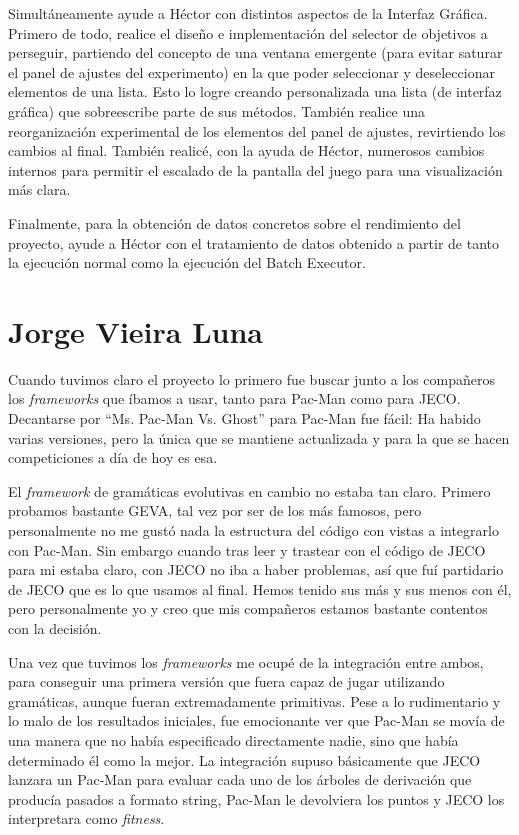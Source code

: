 Simultáneamente ayude a Héctor con distintos aspectos de la Interfaz Gráfica. Primero de todo, realice el diseño e implementación del selector de objetivos a perseguir, partiendo del concepto de una ventana emergente (para evitar saturar el panel de ajustes del experimento) en la que poder seleccionar y deseleccionar elementos de una lista. Esto lo logre creando personalizada una lista (de interfaz gráfica) que sobreescribe parte de sus métodos. También realice una reorganización experimental de los elementos del panel de ajustes, revirtiendo los cambios al final. También realicé, con la ayuda de Héctor, numerosos cambios internos para permitir el escalado de la pantalla del juego para una visualización más clara.
 
Finalmente, para la obtención de datos concretos sobre el rendimiento del proyecto, ayude a Héctor con el tratamiento de datos obtenido a partir de tanto la ejecución normal como la ejecución del Batch Executor.


\section{Jorge Vieira Luna}
Cuando tuvimos claro el proyecto lo primero fue buscar junto a los compañeros los \textit{frameworks} que íbamos a usar, tanto para Pac-Man como para JECO. Decantarse por ``Ms. Pac-Man Vs. Ghost'' para Pac-Man fue fácil: Ha habido varias versiones, pero la única que se mantiene actualizada y para la que se hacen competiciones a día de hoy es esa.

El \textit{framework} de gramáticas evolutivas en cambio no estaba tan claro. Primero probamos bastante GEVA, tal vez por ser de los más famosos, pero personalmente no me gustó nada la estructura del código con vistas a integrarlo con Pac-Man. Sin embargo cuando tras leer y trastear con el código de JECO para mi estaba claro, con JECO no iba a haber problemas, así que fuí partidario de JECO que es lo que usamos al final. Hemos tenido sus más y sus menos con él, pero personalmente yo y creo que mis compañeros estamos bastante contentos con la decisión.

Una vez que tuvimos los \textit{frameworks} me ocupé de la integración entre ambos, para conseguir una primera versión que fuera capaz de jugar utilizando gramáticas, aunque fueran extremadamente primitivas. Pese a lo rudimentario y lo malo de los resultados iniciales, fue emocionante ver que Pac-Man se movía de una manera que no había especificado directamente nadie, sino que había determinado él como la mejor. La integración supuso básicamente que JECO lanzara un Pac-Man para evaluar cada uno de los árboles de derivación que producía pasados a formato string, Pac-Man le devolviera los puntos y JECO los interpretara como \textit{fitness}.

